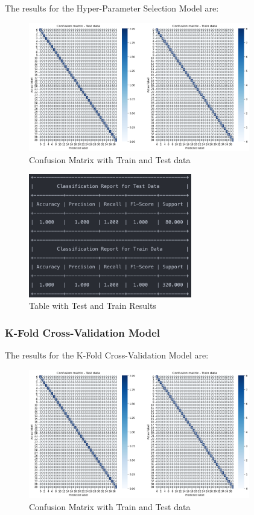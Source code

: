 \documentclass[conference]{IEEEtran}
\begin{document}
The results for the Hyper-Parameter Selection Model are:

\begin{figure}[!h!]
    \includegraphics[width=3.8in]{SVC/2.png}%
    \caption{Confusion Matrix with Train and Test data}%
    \label{fig:conf_gnb_2}%
\end{figure}

\begin{figure}[!h!]
    \includegraphics[width=2.8in]{SVC/r_2.png}%
    \caption{Table with Test and Train Results}%
    \label{fig:conf_gnb_r_2}%
\end{figure}

\subsubsection{K-Fold Cross-Validation Model}

The results for the K-Fold Cross-Validation Model are:

\begin{figure}[h!]
    \includegraphics[width=3.8in]{SVC/3.png}%
    \caption{Confusion Matrix with Train and Test data}%
    \label{fig:conf_gnb_3}%
\end{figure}
\end{document}
